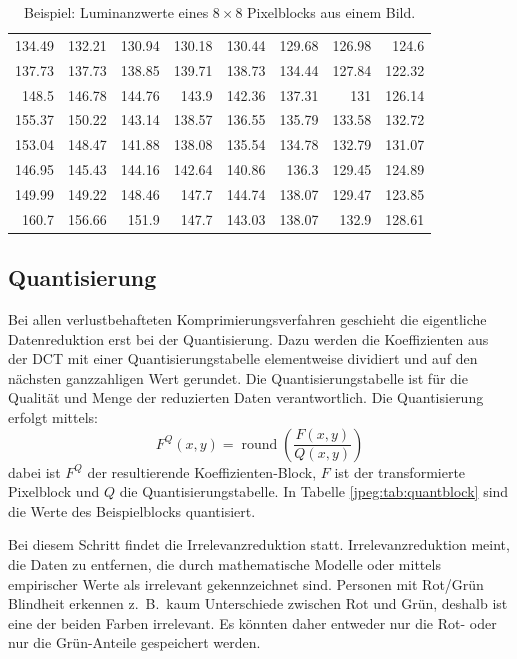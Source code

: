\begin{table}
    \centering
    \begin{tabular}{*{8}{r}}
        134.49 & 132.21 & 130.94 & 130.18 & 130.44 & 129.68 & 126.98 & 124.6\phantom{0}  \\
        137.73 & 137.73 & 138.85 & 139.71 & 138.73 & 134.44 & 127.84 & 122.32 \\
        148.5\phantom{0}  & 146.78 & 144.76 & 143.9\phantom{0}  & 142.36 & 137.31 & 131\phantom{.00}    & 126.14 \\
        155.37 & 150.22 & 143.14 & 138.57 & 136.55 & 135.79 & 133.58 & 132.72 \\
        153.04 & 148.47 & 141.88 & 138.08 & 135.54 & 134.78 & 132.79 & 131.07 \\
        146.95 & 145.43 & 144.16 & 142.64 & 140.86 & 136.3\phantom{0}  & 129.45 & 124.89 \\
        149.99 & 149.22 & 148.46 & 147.7\phantom{0}  & 144.74 & 138.07 & 129.47 & 123.85 \\
        160.7\phantom{0}  & 156.66 & 151.9\phantom{0}  & 147.7\phantom{0}  & 143.03 & 138.07 & 132.9\phantom{0}  & 128.61
    \end{tabular}
    \caption{Beispiel: Luminanzwerte eines \(8\times8\) Pixelblocks aus einem Bild.
        \label{jpeg:tab:orgblock}}
\end{table}

\subsection{Quantisierung
\label{jpeg:subsection:quantisierung}}
Bei allen verlustbehafteten Komprimierungsverfahren geschieht die eigentliche Datenreduktion erst bei der Quantisierung.
%
Dazu werden die Koeffizienten aus der DCT mit einer Quantisierungs\-tabelle elementweise dividiert und auf den nächsten ganzzahligen Wert gerundet.
Die Quantisierungs\-tabelle ist für die Qualität und Menge der reduzierten Daten verantwortlich.
%
Die Quantisierung erfolgt mittels:
\begin{equation}
    F^Q(x,y)
    =
    \operatorname{round} \left(
    \frac{F(x,y)}{Q(x,y)}
    \right)
\end{equation}
dabei ist \(F^Q\) der resultierende Koeffizienten-Block, \(F\) ist der transformierte Pixelblock und \(Q\) die Quantisierungstabelle.
In Tabelle \ref{jpeg:tab:quantblock} sind die Werte des Beispielblocks quantisiert.

Bei diesem Schritt findet die Irrelevanzreduktion statt.
Irrelevanzreduktion meint, die Daten zu entfernen, die durch mathematische Modelle oder mittels empirischer Werte als irrelevant gekennzeichnet sind.
Personen mit Rot/Grün Blindheit erkennen z.~B.~kaum Unterschiede zwischen Rot und Grün, deshalb ist eine der beiden Farben irrelevant.
Es könnten daher entweder nur die Rot- oder nur die Grün-Anteile gespeichert werden.

